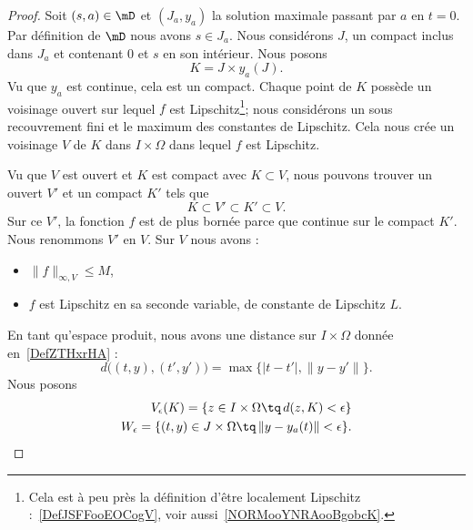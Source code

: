 \begin{proof}
    Soit \( (s,a)\in\mD\) et \( (J_a,y_a)\) la solution maximale passant par \( a\) en \( t=0\). Par définition de \( \mD\) nous avons \( s\in J_a\). Nous considérons \( J\), un compact inclus dans \( J_a\) et contenant \( 0\) et \( s\) en son intérieur. Nous posons
    \begin{equation}
        K=J\times y_a(J).
    \end{equation}
    Vu que \( y_a\) est continue, cela est un compact. Chaque point de \( K\) possède un voisinage ouvert sur lequel \( f\) est Lipschitz\footnote{Cela est à peu près la définition d'être localement Lipschitz :~\ref{DefJSFFooEOCogV}, voir aussi~\ref{NORMooYNRAooBgobcK}.}; nous considérons un sous recouvrement fini et le maximum des constantes de Lipschitz. Cela nous crée un voisinage \( V\) de \( K\) dans \( I\times \Omega\) dans lequel \( f\) est Lipschitz.

    Vu que \( V\) est ouvert et \( K\) est compact avec \( K\subset V\), nous pouvons trouver un ouvert \( V'\) et un compact \( K'\) tels que
    \begin{equation}
        K\subset V'\subset K'\subset V.
    \end{equation}
    Sur ce \( V'\), la fonction \( f\) est de plus bornée parce que continue sur le compact \( K'\). Nous renommons \( V'\) en \( V\). Sur \( V\) nous avons :
    \begin{itemize}
        \item \( \| f \|_{\infty,V}\leq M\),
        \item \( f\) est Lipschitz en sa seconde variable, de constante de Lipschitz \( L\).
    \end{itemize}


    En tant qu'espace produit, nous avons une distance sur \( I\times \Omega\) donnée en~\ref{DefZTHxrHA} :
    \begin{equation}
        d\big( (t,y),(t',y') \big)=\max\big\{  | t-t' |,\| y-y' \|   \big\}.
    \end{equation}
    Nous posons
    \begin{subequations}
        \begin{align}
            V_{\epsilon}(K)=\{ z\in I\times \Omega \tq\,d(z,K)<\epsilon  \}\\
            W_{\epsilon}=\{ (t,y)\in J\times \Omega\tq\,\| y- y_a(t) \|<\epsilon \}.
        \end{align}
    \end{subequations}


\end{proof}
